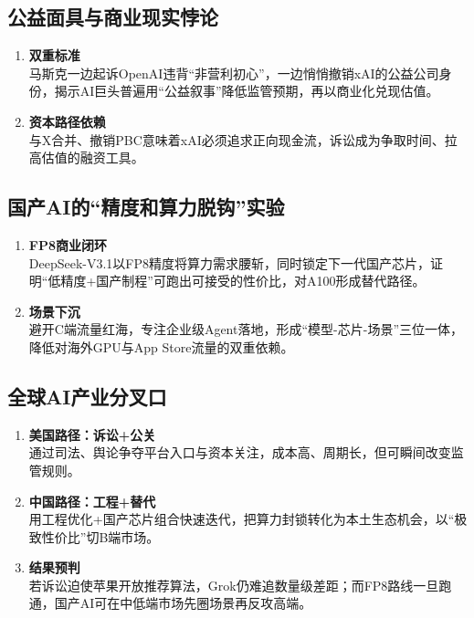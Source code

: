 \subsection{公益面具与商业现实悖论}
\begin{enumerate}[leftmargin=*, nosep]
    \item \textbf{双重标准}  \\
    马斯克一边起诉OpenAI违背“非营利初心”，一边悄悄撤销xAI的公益公司身份，揭示AI巨头普遍用“公益叙事”降低监管预期，再以商业化兑现估值。
    \item \textbf{资本路径依赖}  \\
    与X合并、撤销PBC意味着xAI必须追求正向现金流，诉讼成为争取时间、拉高估值的融资工具。
\end{enumerate}

\subsection{国产AI的“精度和算力脱钩”实验}
\begin{enumerate}[leftmargin=*, nosep]
    \item \textbf{FP8商业闭环}  \\
    DeepSeek-V3.1以FP8精度将算力需求腰斩，同时锁定下一代国产芯片，证明“低精度+国产制程”可跑出可接受的性价比，对A100形成替代路径。
    \item \textbf{场景下沉}  \\
    避开C端流量红海，专注企业级Agent落地，形成“模型-芯片-场景”三位一体，降低对海外GPU与App Store流量的双重依赖。
\end{enumerate}

\subsection{全球AI产业分叉口}
\begin{enumerate}[leftmargin=*, nosep]
    \item \textbf{美国路径：诉讼+公关}  \\
    通过司法、舆论争夺平台入口与资本关注，成本高、周期长，但可瞬间改变监管规则。
    \item \textbf{中国路径：工程+替代}  \\
    用工程优化+国产芯片组合快速迭代，把算力封锁转化为本土生态机会，以“极致性价比”切B端市场。
    \item \textbf{结果预判}  \\
    若诉讼迫使苹果开放推荐算法，Grok仍难追数量级差距；而FP8路线一旦跑通，国产AI可在中低端市场先圈场景再反攻高端。
\end{enumerate}